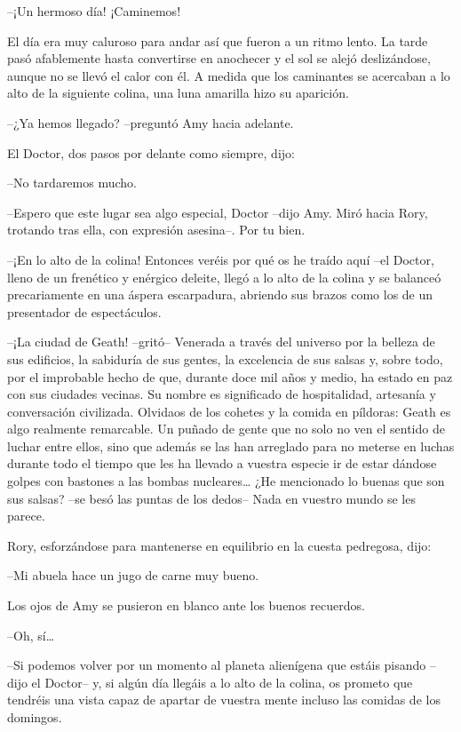 {--¡Un hermoso día! ¡Caminemos!}

{El día era muy caluroso para andar así que fueron a un ritmo lento. La
	tarde pasó afablemente hasta convertirse en anochecer y el sol se alejó
	deslizándose, aunque no se llevó el calor con él. A medida que los
	caminantes se acercaban a lo alto de la siguiente colina, una luna
amarilla hizo su aparición.}

{--¿Ya hemos llegado? --preguntó Amy hacia adelante.}

{El Doctor, dos pasos por delante como siempre, dijo:}

{--No tardaremos mucho.}

{--Espero que este lugar sea algo especial, Doctor --dijo Amy. Miró
hacia Rory, trotando tras ella, con expresión asesina--. Por tu bien.}

{--¡En lo alto de la colina! Entonces veréis por qué os he traído aquí
	--el Doctor, lleno de un frenético y enérgico deleite, llegó a lo alto
	de la colina y se balanceó precariamente en una áspera escarpadura,
abriendo sus brazos como los de un presentador de espectáculos.}

{--¡La ciudad de Geath! --gritó-- Venerada a través del universo por
	la belleza de sus edificios, la sabiduría de sus gentes, la excelencia
	de sus salsas y, sobre todo, por el improbable hecho de que, durante
	doce mil años y medio, ha estado en paz con sus ciudades vecinas. Su
	nombre es significado de hospitalidad, artesanía y conversación
	civilizada. Olvidaos de los cohetes y la comida en píldoras: Geath es
	algo realmente remarcable. Un puñado de gente que no solo no ven el
	sentido de luchar entre ellos, sino que además se las han arreglado para
	no meterse en luchas durante todo el tiempo que les ha llevado a vuestra
	especie ir de estar dándose golpes con bastones a las bombas
	nucleares\ldots{} ¿He mencionado lo buenas que son sus salsas? --se besó
las puntas de los dedos-- Nada en vuestro mundo se les parece.}

{Rory, esforzándose para mantenerse en equilibrio en la cuesta
pedregosa, dijo:}

{--Mi abuela hace un jugo de carne muy bueno.}

{Los ojos de Amy se pusieron en blanco ante los buenos recuerdos.}

{--Oh, sí\ldots{}}

{--Si podemos volver por un momento al planeta alienígena que estáis
	pisando --dijo el Doctor-- y, si algún día llegáis a lo alto de la
	colina, os prometo que tendréis una vista capaz de apartar de vuestra
mente incluso las comidas de los domingos.}

